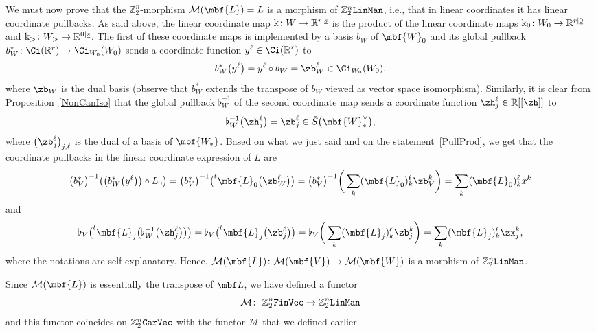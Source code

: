 \documentclass[pdftex]{sigma}%
\newcommand{\rmk}{\textnormal{k}}
\newcommand{\R}{{\mathbb R}}
\newcommand{\Z}{{\mathbb Z}}
\def\ul{\underline}
\def\cM{\cal M}
\def\cM{\mathcal{M}}
\def\ul{\underline}
\newcommand{\0}{\otimes}
\numberwithin{equation}{section}
\begin{document}
We must now prove that the $\Z_2^n$-morphism $\cM(\mbf{L})=L$ is a morphism of $\Z_2^n\tt LinMan$, i.e., that in linear coordinates it has linear coordinate pullbacks. As said above, the linear coordinate map $\rmk\colon W\to\R^{r|\ul s}$ is the product of the linear coordinate maps $\rmk_0\colon W_0\to \R^{r|\ul 0}$ and $\rmk_>\colon W_>\to \R^{0|\ul s}$. The first of these coordinate maps is implemented by a basis $b_W$ of $\mbf{W}_0$ and its global pullback $b_W^*\colon \Ci(\R^r)\to \Ci_{W_0}(W_0)$ sends a coordinate function $y^\ell\in \Ci(\R^r)$ to
\[
b_W^*\big(y^\ell\big)=y^\ell\circ b_W=\zb_W^\ell\in\Ci_{W_0}(W_0),
\]
where $\zb_W$ is the dual basis (observe that $b^*_W$ extends the transpose of $b_W$ viewed as vector space isomorphism). Similarly, it is clear from Proposition~\ref{NonCanIso} that the global pullback $\flat_W^{-1}$ of the second coordinate map sends a coordinate function $\zh_j^\ell\in\R[[\zh]]$ to
\[
\flat^{-1}_W\big(\zh_j^\ell\big)=\zb_j^\ell\in\bar S\big(\mbf{W}^\vee_*\big),
\]
where $\big(\zb_j^\ell\big)_{j,\ell}$ is the dual of a basis of $\mbf{W_*}$. Based on what we just said and on the statement~\eqref{PullProd}, we get that the coordinate pullbacks in the linear coordinate expression of $L$ are
\[
\big(b^*_V\big)^{-1}\big(\big(b_W^*\big(y^\ell\big)\big)\circ L_0\big) =\big(b^*_V\big)^{-1}\big(^t\mbf{L}_0\big(\zb_W^{\ell}\big)\big)
=\big(b^*_V\big)^{-1}\bigg(\sum_k(\mbf{L}_0)^\ell_k\zb_V^k\bigg)
=\sum_k(\mbf{L}_0)^\ell_kx^k
\]
and \[
\flat_V\big(^t\mbf{L}_j\big(\flat_W^{-1}\big(\zh_j^{\ell}\big)\big)\big)
=\flat_V\big(^t\mbf{L}_j\big(\zb_j^{\ell}\big)\big) =\flat_V\bigg(\sum_k(\mbf{L}_j)^\ell_k\zb^k_j\bigg)=\sum_k(\mbf{L}_j)^\ell_k\zx_j^k,
\]
where the notations are self-explanatory. Hence, $\cM(\mbf{L})\colon \cM(\mbf{V})\to\cM(\mbf{W})$ is a morphism of $\Z_2^n\tt LinMan$.

Since $\cM(\mbf{L})$ is essentially the transpose of $\mbf L$, we have defined a functor
\[
\cM\colon\ \Z_2^n{\tt FinVec}\to\Z_2^n\tt LinMan
\]
and this functor coincides on $\Z_2^n\tt CarVec$ with the functor $\cM$ that we defined earlier.
\end{document}
